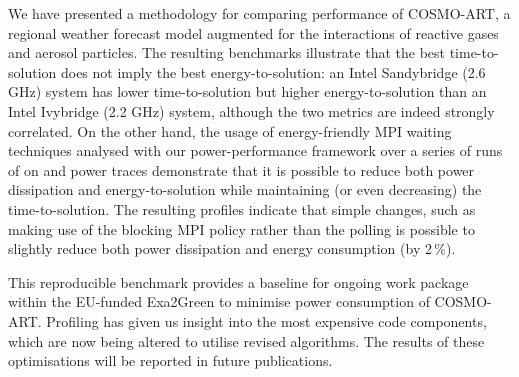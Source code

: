 We  have   presented  a  methodology  for   comparing  performance  of
COSMO-ART,  a  regional  weather  forecast  model  augmented  for  the
interactions of  reactive gases and aerosol  particles.  The resulting
benchmarks illustrate  that the  best time-to-solution does  not imply
the best energy-to-solution: an Intel Sandybridge (2.6 GHz) system has
lower  time-to-solution but  higher energy-to-solution  than  an Intel
Ivybridge  (2.2  GHz) system,  although  the  two  metrics are  indeed
strongly correlated.  On the  other hand, the usage of energy-friendly
MPI waiting  techniques analysed with  our power-performance framework
over  a  series  of runs  of  \cosmoart  on  \tinto and  power  traces
demonstrate that it  is possible to reduce both  power dissipation and
energy-to-solution   while  maintaining   (or  even   decreasing)  the
time-to-solution. The resulting profiles indicate that simple changes,
such as making use of the  blocking MPI policy rather than the polling
is  possible to  slightly  reduce both  power  dissipation and  energy
consumption (by 2\,\%).

This  reproducible  benchmark provides  a  baseline  for ongoing  work
package within  the EU-funded Exa2Green to  minimise power consumption
of COSMO-ART. Profiling  has given us insight into  the most expensive
code  components,  which are  now  being  altered  to utilise  revised
algorithms.  The  results of these  optimisations will be  reported in
future publications.
